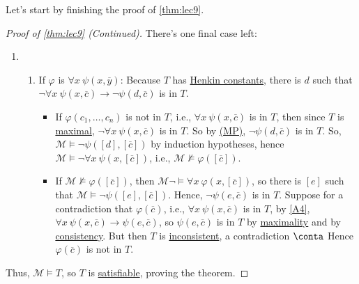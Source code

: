 Let's start by finishing the proof of \autoref{thm:lec9}.

\begin{proof}[Proof of \autoref{thm:lec9} (Continued)]
	There's one final case left:
	\begin{enumerate}
		\item[] \begin{enumerate}\setcounter{enumii}{\thestoppedhere}
				\item If \(\varphi \) is \(\forall x\ \psi (x, \overline{y} )\): Because \(T\) has \hyperref[def:Henkin-constant]{Henkin constants}, there is \(d\) such that \(\lnot \forall x\ \psi (x, \overline{c} ) \to \lnot \psi (d, \overline{c} )\) is in \(T\).
				      \begin{itemize}
					      \item If \(\varphi (c_1, \dots , c_n)\) is not in \(T\), i.e., \(\forall x\ \psi (x, \overline{c} )\) is in \(T\), then since \(T\) is \hyperref[def:maximal]{maximal}, \(\lnot \forall x\ \psi (x, \overline{c} )\) is in \(T\). So by \hyperref[def:rule-of-inference]{(MP)}, \(\lnot \psi (d, \overline{c} )\) is in \(T\). So, \(\mathcal{M} \models \lnot \psi ([d], [\overline{c} ])\) by induction hypotheses, hence \(\mathcal{M} \models \lnot \forall x\ \psi (x, [\overline{c} ])\), i.e., \(\mathcal{M} \not \models \varphi ([\overline{c} ])\).
					      \item If \(\mathcal{M} \not \models \varphi ([\overline{c} ])\), then \(\mathcal{M} \lnot \models \forall x\ \varphi (x, [\overline{c} ])\), so there is \([e]\) such that \(\mathcal{M} \models \lnot \psi ([e], [\overline{c} ])\). Hence, \(\lnot \psi (e, \overline{c} )\) is in \(T\). Suppose for a contradiction that \(\varphi (\overline{c} )\), i.e., \(\forall x\ \psi (x, \overline{c} )\) is in \(T\), by \autoref{A4}, \(\forall x\ \psi (x, \overline{c} ) \to \psi (e, \overline{c} )\), so \(\psi (e, \overline{c} )\) is in \(T\) by \hyperref[def:maximal]{maximality} and by \hyperref[def:consistent]{consistency}. But then \(T\) is \hyperref[def:inconsistent]{inconsistent}, a contradiction \(\conta\) Hence \(\varphi (\overline{c} )\) is not in \(T\).
				      \end{itemize}
			\end{enumerate}
	\end{enumerate}
	Thus, \(\mathcal{M} \models T\), so \(T\) is \hyperref[def:satisfiable]{satisfiable}, proving the theorem.
\end{proof}

